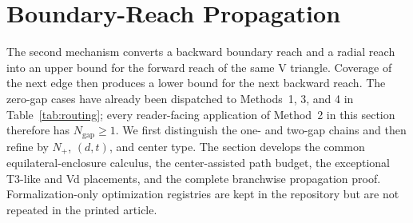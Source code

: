 \section{Boundary-Reach Propagation}
\label{sec:boundary-propagation}

The second mechanism converts a backward boundary reach and a radial reach
into an upper bound for the forward reach of the same V triangle.
Coverage of the next edge then produces a lower bound for the next backward
reach.  The zero-gap cases have already been dispatched to Methods~1, 3, and
4 in Table~\ref{tab:routing}; every reader-facing application of Method~2 in
this section therefore has $N_{\mathrm{gap}}\ge1$.  We first distinguish the
one- and two-gap chains and then refine by $N_+$, $(d,t)$, and center type.
The section develops the common equilateral-enclosure calculus, the
center-assisted path budget, the exceptional T3-like and Vd placements, and
the complete branchwise propagation proof.  Formalization-only optimization
registries are kept in the repository but are not repeated in the printed
article.

\begingroup
\let\PrintedSubsection\subsection
\let\PrintedSubsubsection\subsubsection
\let\PrintedParagraph\paragraph
\let\section\PrintedSubsection
\renewcommand{\subsection}[1]{\PrintedSubsubsection{#1}\leavevmode\par}
\renewcommand{\subsubsection}[1]{\PrintedParagraph{#1}\leavevmode\par}

\endgroup

\SignedCenterPropagation

